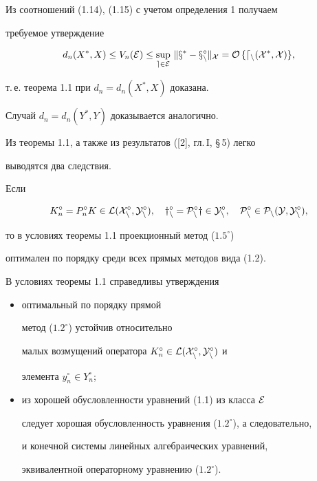 Из соотношений (1.14), (1.15) с учетом определения 1 получаем


требуемое утверждение


$$


d_n(X^*,X)\leq V_n(\cal E)\leq \sup_{e\in \cal E}\,


\|x^*-x_n^\circ\|_X =O\, \{ d_n(X^*,X)\} ,


$$


т.\,е. теорема 1.1 при $d_n=d_n(X^*,X)$ доказана.


Случай $d_n=d_n(Y^*,Y)$ доказывается аналогично.





Из теоремы 1.1, а также из результатов ([2], гл.\,I, \S\,5) легко


выводятся два следствия.





\begin{cor}


Если


$$


K_n^\circ =P_n^\circ K\in \cal L(X_n^\circ ,Y_n^\circ),\quad


y_n^\circ=P_n^\circ y\in Y_n^\circ ,\quad


P_n^\circ\in \cal P_n(Y,Y_n^\circ),


$$


то в условиях теоремы 1.1 проекционный метод ($1.5^\circ $)


оптимален по порядку среди всех прямых методов вида (1.2).


\end{cor}





\begin{cor}


В условиях теоремы 1.1 справедливы утверждения


\begin{itemize}


\item[а)] оптимальный по порядку прямой


метод ($1.2^\circ $) устойчив относительно


малых возмущений оператора $K_n^\circ\in \cal L(X_n^\circ,Y_n^\circ)$ и


элемента $y_n^\circ\in Y_n^\circ$;


\item[б)] из хорошей обусловленности уравнений (1.1) из класса $\cal E$


следует хорошая обусловленность уравнения ($1.2^\circ $), а следовательно,


и конечной системы линейных алгебраических уравнений,


эквивалентной операторному уравнению ($1.2^\circ $).


\end{itemize}


\end{cor}





